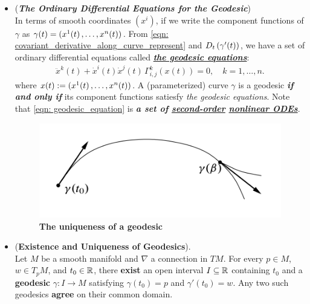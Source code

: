 \documentclass[11pt]{article}
\begin{document}
\begin{itemize}
\item \begin{remark} (\emph{\textbf{The Ordinary Differential Equations for the Geodesic}})\\
In terms of smooth coordinates $(x^i)$, if we write the component functions of $\gamma$ as $\gamma(t) = (x^1(t) \,{,}\ldots{,}\, x^n(t))$. From \eqref{eqn: covariant_derivative_along_curve_represent} and  $D_t\left(\gamma'(t)\right)$, we have a set of ordinary differential equations called \underline{\emph{\textbf{the geodesic equations}}}:
\begin{align}
\ddot{x}^k(t)  + \dot{x}^{i}(t)\dot{x}^j(t)\,\Gamma_{i,j}^{k}(x(t)) = 0, \quad k=1,\ldots, n \label{eqn: geodesic_equation}.
\end{align} where $x(t) := (x^1(t) \,{,}\ldots{,}\, x^n(t))$. A (parameterized) curve $\gamma$ is a geodesic \emph{\textbf{if and only if}} its component functions satiesfy \emph{the geodesic equations}. Note that \eqref{eqn: geodesic_equation} is \emph{\textbf{a set of \underline{second-order} \underline{nonlinear ODEs}}}.
\end{remark}

\begin{figure}
\begin{minipage}[htb]{1\linewidth}
  \centering
  \centerline{\includegraphics[scale = 0.5]{uniqueness_geodesics.png}}
\end{minipage}
\caption{\footnotesize{\textbf{The uniqueness of a geodesic \citep{lee2018introduction}}}}
\label{fig: uniqueness_geodesics}
\end{figure}


\item \begin{theorem}(\textbf{Existence and Uniqueness of Geodesics}). \citep{lee2018introduction} \\
Let $M$ be a smooth manifold and $\nabla$ a connection in $TM$. For every $p \in M$, $w \in T_{p}M$, and $t_0 \in {\mathbb R}$, there \textbf{exist} an open interval $I \subseteq {\mathbb R}$ containing $t_0$ and a \textbf{geodesic} $\gamma: I \rightarrow M$  satisfying $\gamma(t_0) = p$ and $\gamma'(t_0) = w$. Any two such geodesics \textbf{agree} on their common domain.
\end{theorem}


\end{itemize}
\end{document}
